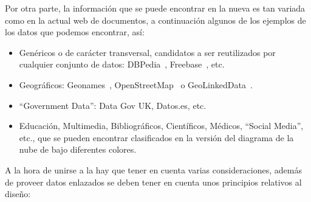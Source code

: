 Por otra parte, la información que se puede encontrar en la nueva \wod es tan variada como en la actual
web de documentos, a continuación algunos de los ejemplos de los datos que podemos encontrar, así:

\begin{itemize}
 \item Genéricos o de carácter transversal, candidatos a ser reutilizados por cualquier conjunto de datos: DBPedia~\cite{Bizer:2009:D-C:1640541.1640848}, 
Freebase~\cite{freebase}, etc.
 \item Geográficos: Geonames~\cite{geonames}, OpenStreetMap~\cite{open-street-maps} o GeoLinkedData~\cite{SLHA11}.
 \item ``Government Data'': Data Gov UK, Datos.es, etc.
 \item Educación, Multimedia, Bibliográficos, Científicos, Médicos, ``Social Media'', etc., que se pueden encontrar clasificados
en la versión del diagrama de la nube de \lod bajo diferentes colores.
\end{itemize}

A la hora de unirse a la \wod hay que tener en cuenta varias consideraciones, además de proveer
datos enlazados se deben tener en cuenta unos principios relativos al diseño:

